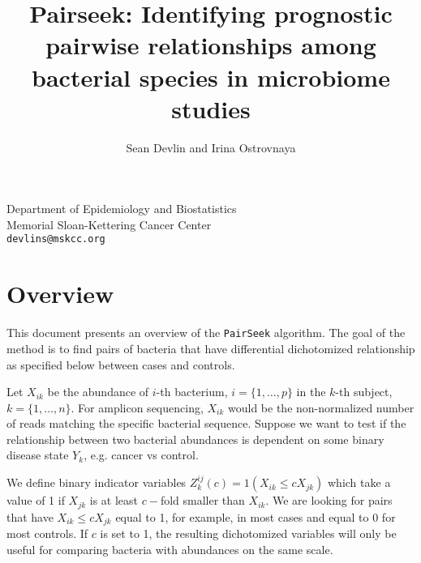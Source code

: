\documentclass[11pt]{article}
\begin{document}



\title{\bf Pairseek: Identifying prognostic  pairwise relationships among bacterial species in microbiome studies}

\author{Sean Devlin and Irina Ostrovnaya}

\maketitle

\begin{center}
Department of Epidemiology and Biostatistics\\
Memorial Sloan-Kettering Cancer Center\\
{\tt devlins@mskcc.org}\\
\end{center}

\tableofcontents

\section{Overview}

This document presents an overview of the {\tt PairSeek} algorithm. The goal of the method is to find pairs of bacteria that have differential dichotomized relationship as specified below between cases and controls.

 Let $X_{ik}$  be the abundance of $i$-th  bacterium, $i=\{1, \ldots ,p\}$ in the $k$-th subject, $k=\{1, \ldots ,n\}$. For amplicon
sequencing, $X_{ik}$  would be the non-normalized number of reads matching the specific bacterial sequence. Suppose we want to test if the relationship between two  bacterial abundances is dependent on some binary disease state $Y_k$, e.g. cancer vs control.

We define binary indicator variables  $Z_k^{ij}(c)=1(X_{ik} \le c X_{jk})$ which take a value of 1 if  $X_{jk}$ is at least $c-$fold smaller than $X_{ik}$. We are looking for pairs that have $X_{ik} \le c X_{jk}$ equal to 1, for example, in most cases and equal to 0 for most controls. If $c$ is set to 1, the resulting dichotomized variables will only be  useful for comparing bacteria with abundances on the same scale.
\end{document}
